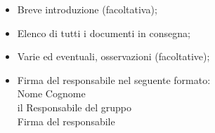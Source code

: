 {{\begin{itemize}
					Prof. Tullio Vardanega\\
					Università degli Studi di Padova\\
					Via Trieste 63\\
					35121 Padova (PD)
			\item Breve introduzione (facoltativa);
			\item Elenco di tutti i documenti in consegna;
			\item Varie ed eventuali, osservazioni (facoltative);
			\item Firma del responsabile nel seguente formato:\\
					{Nome} {Cognome}\\
					il Responsabile del gruppo \gruppo \\
					{Firma del responsabile}
		\end{itemize}		
	}
}
